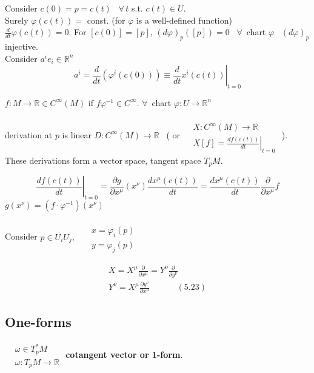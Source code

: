 \documentclass{book}
\begin{document}
Consider $c(0) = p = c(t)$ \, $\forall \, t $ s.t. $c(t) \in U$.   \\
Surely $\varphi(c(t)) = $ const. (for $\varphi$ is a well-defined function)  \\
$\frac{d}{dt} \varphi(c(t)) = 0$.  For $[c(0)] = [p]$, $ (d\varphi)_p ([p ]) = 0$ \, $\forall \, $ chart $\varphi$ \, $(d\varphi)_p$ injective.  \\
Consider $a^i e_i \in \mathbb{R}^n$ 
\[
a^i = \frac{d}{dt} ( \varphi^i(c(0)) ) \equiv \left. \frac{d}{dt} x^i(c(t)) \right|_{t=0}
\]

$f: M \to \mathbb{R} \in C^{\infty}(M)$ if $f\varphi^{-1} \in C^{\infty}$.  $\forall \, $ chart $\varphi : U \to \mathbb{R}^n$ 

derivation at $p$ is linear $D : C^{\infty}(M) \to \mathbb{R}$ \, ( or $\begin{aligned} & \quad \\ 
  & X: C^{\infty}(M) \to \mathbb{R} \\ 
  & X[f] =\left.  \frac{df(c(t)) }{ dt} \right|_{t=0} \end{aligned}$ ).  These derivations form a vector space, tangent space $T_pM$. 

\[
\left. \frac{df(c(t))}{dt}  \right|_{t=0} = \frac{ \partial g}{ \partial x^{\mu} }(x^{\nu}) \frac{dx^{\mu}(c(t)) }{ dt} = \frac{dx^{\mu}(c(t)) }{dt} \frac{ \partial}{ \partial x^{\mu} } f
\]
$g(x^{\nu}) = (f\cdot \varphi^{-1})(x^{\nu})$

Consider $p\in U_i U_j$, \, $\begin{aligned} & \quad \\
  & x = \varphi_i(p) \\ 
  & y = \varphi_j(p) \end{aligned}$ 

\[
\begin{gathered}
  X = X^{\mu} \frac{ \partial }{ \partial x^{\mu} } = Y^{\nu} \frac{ \partial }{ \partial y^{\nu}} \\ 
  Y^{\nu} = X^{\mu} \frac{ \partial y^{\nu} }{ \partial x^{\mu} } \quad \quad \quad \, (5.23)
\end{gathered}
\]



\subsection{One-forms}

$\begin{aligned}
  & \omega \in T_p^*M \\ 
  & \omega : T_p M \to \mathbb{R} \end{aligned}$ \quad \textbf{cotangent vector or 1-form}.  \\
\end{document}
